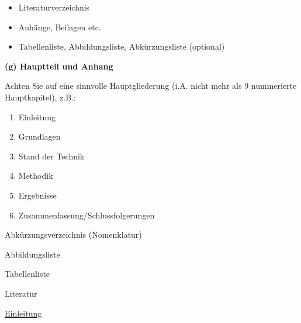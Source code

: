 \begin{itemize}
    \item Literaturverzeichnis
    \item Anhänge, Beilagen etc.
    \item Tabellenliste, Abbildungsliste, Abkürzungsliste (optional)
\end{itemize}

\newpage

\textbf{(g) Hauptteil und Anhang}

\vspace{1mm}

Achten Sie auf eine sinnvolle Hauptgliederung (i.A. nicht mehr als 9 nummerierte Hauptkapitel), z.B.:

\begin{enumerate}
    \item Einleitung
    \item Grundlagen
    \item Stand der Technik
    \item Methodik
    \item Ergebnisse
    \item Zusammenfassung/Schlussfolgerungen
\end{enumerate}
\hspace{5mm}
Abkürzungsverzeichnis (Nomenklatur)

\vspace{1mm}

\hspace{5mm}
Abbildungsliste

\vspace{1mm}

\hspace{5mm}
Tabellenliste

\vspace{1mm}

\hspace{5mm}
Literatur

\vspace{5mm}

\underline{Einleitung}

